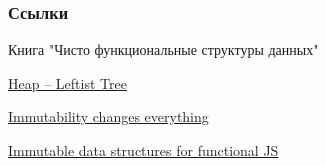 \documentclass[aspectratio=169
  , xcolor={svgnames}
  , hyperref=
      { colorlinks
      , urlcolor=DarkBlue 
      }  
  , russian  %
  ]{beamer}
\theoremstyle{exerciseStyle1}
\begin{document}
\begin{frame}%
\frametitle<presentation>{Ссылки}
\begin{thebibliography}{10}
  Книга "Чисто функциональные структуры данных"

  \href{http://typeocaml.com/2015/03/12/heap-leftist-tree/}{Heap -- Leftist Tree}
  
  \href{https://doi.org/10.1145/2857274.2884038}{Immutability changes everything}
  
  \href{https://www.youtube.com/watch?v=Wo0qiGPSV-s}{Immutable data structures for functional JS}
  
\end{thebibliography}
\end{frame}
\end{document}
